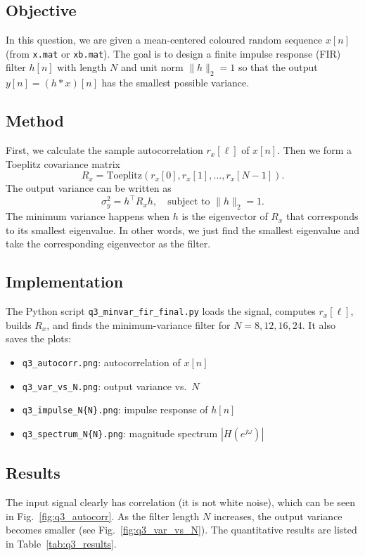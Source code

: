 \documentclass[12pt,a4paper]{article}
\begin{document}
\subsection{Objective}
In this question, we are given a mean-centered coloured random sequence $x[n]$ (from \texttt{x.mat} or \texttt{xb.mat}).  
The goal is to design a finite impulse response (FIR) filter $h[n]$ with length $N$ and unit norm $\|h\|_2 = 1$ so that the output $y[n]=(h*x)[n]$ has the smallest possible variance.

\subsection{Method}
First, we calculate the sample autocorrelation $r_x[\ell]$ of $x[n]$.  
Then we form a Toeplitz covariance matrix
\[
R_x = \mathrm{Toeplitz}(r_x[0], r_x[1], \ldots, r_x[N-1]).
\]
The output variance can be written as
\[
\sigma_y^2 = h^\top R_x h, \quad \text{subject to } \|h\|_2 = 1.
\]
The minimum variance happens when $h$ is the eigenvector of $R_x$ that corresponds to its smallest eigenvalue.  
In other words, we just find the smallest eigenvalue and take the corresponding eigenvector as the filter.

\subsection{Implementation}
The Python script \texttt{q3\_minvar\_fir\_final.py} loads the signal, computes $r_x[\ell]$, builds $R_x$, and finds the minimum-variance filter for $N=8,12,16,24$.  
It also saves the plots:
\begin{itemize}
    \item \texttt{q3\_autocorr.png}: autocorrelation of $x[n]$
    \item \texttt{q3\_var\_vs\_N.png}: output variance vs.\ $N$
    \item \texttt{q3\_impulse\_N\{N\}.png}: impulse response of $h[n]$
    \item \texttt{q3\_spectrum\_N\{N\}.png}: magnitude spectrum $|H(e^{j\omega})|$
\end{itemize}

\subsection{Results}
The input signal clearly has correlation (it is not white noise), which can be seen in Fig.~\ref{fig:q3_autocorr}.  
As the filter length $N$ increases, the output variance becomes smaller (see Fig.~\ref{fig:q3_var_vs_N}).  
The quantitative results are listed in Table~\ref{tab:q3_results}.
\end{document}
